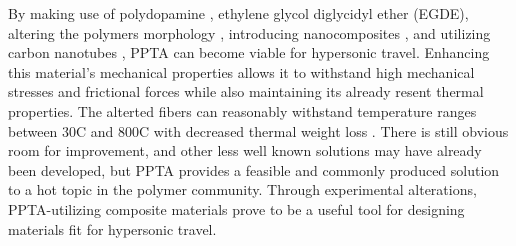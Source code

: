 \documentclass[12pt]{article}
\begin{document}
\begin{multicols}{2}
\indent By making use of polydopamine \citep{Yuan2017}, ethylene glycol diglycidyl ether (EGDE)\citep{LeiWang2017}, altering the polymers morphology \citep{Kanbargi2017}, introducing nanocomposites \citep{BoZhang2021}, and utilizing carbon nanotubes \citep{Yang2019}, PPTA can become viable for hypersonic travel. Enhancing this material's mechanical properties allows it to withstand high mechanical stresses and frictional forces while also maintaining its already resent thermal properties. The alterted fibers can reasonably withstand temperature ranges between 30\degree C and 800\degree C with decreased thermal weight loss \citep{ShushengChen2014}. There is still obvious room for improvement, and other less well known solutions may have already been developed, but PPTA provides a feasible and commonly produced solution to a hot topic in the polymer community. Through experimental alterations, PPTA-utilizing composite materials prove to be a useful tool for designing materials fit for hypersonic travel.

\end{multicols}

\newpage 


 
\end{document}
